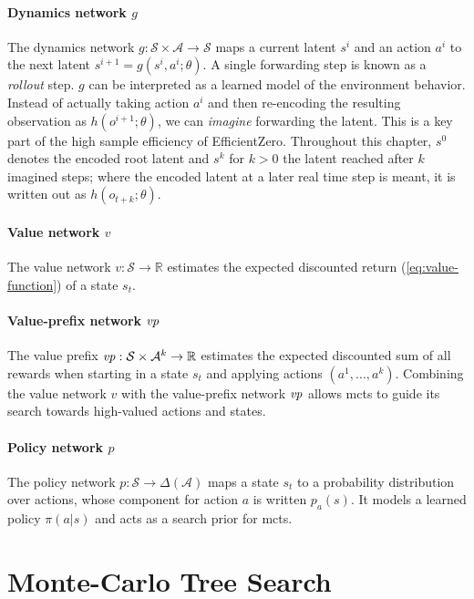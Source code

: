 \paragraph{Dynamics network $g$}
The dynamics network $g:\mathcal{S}\times\mathcal{A}\to\mathcal{S}$ maps a
current latent $s^i$ and an action $a^i$ to the next latent
$s^{i+1}=g(s^i,a^i;\theta)$.
A single forwarding step is known as a \emph{rollout} step.
$g$ can be interpreted as a learned model of the environment behavior.
Instead of actually taking action $a^i$ and then re-encoding the resulting
observation as $h(o^{i+1};\theta)$, we can \emph{imagine} forwarding the latent.
This is a key part of the high sample efficiency of EfficientZero.
Throughout this chapter, $s^0$ denotes the encoded root latent and $s^k$ for
$k>0$ the latent reached after $k$ imagined steps; where the encoded latent at
a later real time step is meant, it is written out as $h(o_{t+k};\theta)$.

\paragraph{Value network $v$}
The value network $v:\mathcal{S}\to\mathbb{R}$ estimates the expected discounted
return (\cref{eq:value-function}) of a state $s_t$.

\paragraph{Value-prefix network $\mathit{vp}$}
The value prefix $\mathit{vp}:\mathcal{S}\times\mathcal{A}^k\to\mathbb{R}$ estimates
the expected discounted sum of all rewards when starting in a state $s_t$ and
applying actions $(a^1,\dots,a^k)$.
Combining the value network $v$ with the value-prefix network $\mathit{vp}$ allows
\gls{mcts} to guide its search towards high-valued actions and states.

\paragraph{Policy network $p$}
The policy network $p:\mathcal{S}\to\Delta(\mathcal{A})$ maps a state $s_t$ to a
probability distribution over actions, whose component for action $a$ is written
$p_a(s)$.
It models a learned policy $\pi(a|s)$ and acts as a search prior for \gls{mcts}.

\section{Monte-Carlo Tree Search}\label{sec:ez-mcts}

